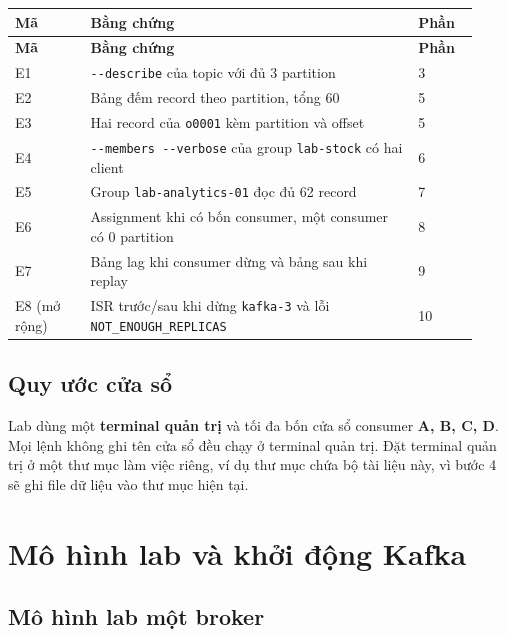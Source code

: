 \begingroup\small
\renewcommand{\arraystretch}{1.2}
\begin{longtable}{@{}p{0.15\linewidth}p{0.65\linewidth}p{0.12\linewidth}@{}}
\toprule
\rowcolor{rowLavender}
\textbf{Mã} & \textbf{Bằng chứng} & \textbf{Phần} \\
\midrule
\endfirsthead
\toprule
\rowcolor{rowLavender}
\textbf{Mã} & \textbf{Bằng chứng} & \textbf{Phần} \\
\midrule
\endhead
\bottomrule
\endfoot
E1 & \texttt{-\allowbreak{}-\allowbreak{}describe} của topic với đủ 3 partition & 3 \\
E2 & Bảng đếm record theo partition, tổng 60 & 5 \\
E3 & Hai record của \texttt{o0001} kèm partition và offset & 5 \\
E4 & \texttt{-\allowbreak{}-\allowbreak{}members -\allowbreak{}-\allowbreak{}verbose} của group \texttt{lab-\allowbreak{}stock} có hai client & 6 \\
E5 & Group \texttt{lab-\allowbreak{}analytics-\allowbreak{}01} đọc đủ 62 record & 7 \\
E6 & Assignment khi có bốn consumer, một consumer có 0 partition & 8 \\
E7 & Bảng lag khi consumer dừng và bảng sau khi replay & 9 \\
E8 (mở rộng) & ISR trước/sau khi dừng \texttt{kafka-\allowbreak{}3} và lỗi \texttt{NOT\_\allowbreak{}ENOUGH\_\allowbreak{}REPLICAS} & 10 \\
\end{longtable}
\endgroup

\subsection{Quy ước cửa sổ}

Lab dùng một \textbf{terminal quản trị} và tối đa bốn cửa sổ consumer \textbf{A, B, C, D}. Mọi lệnh không ghi tên cửa sổ đều chạy ở terminal quản trị. Đặt terminal quản trị ở một thư mục làm việc riêng, ví dụ thư mục chứa bộ tài liệu này, vì bước 4 sẽ ghi file dữ liệu vào thư mục hiện tại.


\section{Mô hình lab và khởi động Kafka}

\subsection{Mô hình lab một broker}

